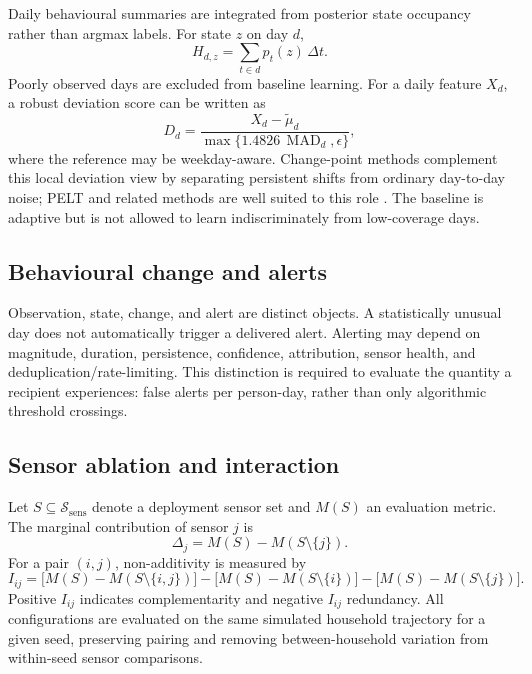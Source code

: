 \documentclass[11pt]{article}
\newcommand{\calS}{\mathcal{S}}
\begin{document}
Daily behavioural summaries are integrated from posterior state occupancy rather than argmax labels. For state $z$ on day $d$,
\begin{equation}
    H_{d,z}=\sum_{t\in d} p_t(z)\,\Delta t.
\end{equation}
Poorly observed days are excluded from baseline learning. For a daily feature $X_d$, a robust deviation score can be written as
\begin{equation}
    D_d =
    \frac{X_d-\widetilde{\mu}_d}
    {\max\{1.4826\,\operatorname{MAD}_d,\epsilon\}},
\end{equation}
where the reference may be weekday-aware. Change-point methods complement this local deviation view by separating persistent shifts from ordinary day-to-day noise; PELT and related methods are well suited to this role \citep{killick2012pelt}. The baseline is adaptive but is not allowed to learn indiscriminately from low-coverage days.

\subsection{Behavioural change and alerts}

Observation, state, change, and alert are distinct objects. A statistically unusual day does not automatically trigger a delivered alert. Alerting may depend on magnitude, duration, persistence, confidence, attribution, sensor health, and deduplication/rate-limiting. This distinction is required to evaluate the quantity a recipient experiences: false alerts per person-day, rather than only algorithmic threshold crossings.

\subsection{Sensor ablation and interaction}

Let $S\subseteq\calS_{\mathrm{sens}}$ denote a deployment sensor set and $M(S)$ an evaluation metric. The marginal contribution of sensor $j$ is
\begin{equation}
    \Delta_j = M(S)-M(S\setminus\{j\}).
\end{equation}
For a pair $(i,j)$, non-additivity is measured by
\begin{equation}
I_{ij} = \big[M(S)-M(S\setminus\{i,j\})\big]
-\big[M(S)-M(S\setminus\{i\})\big]
-\big[M(S)-M(S\setminus\{j\})\big].
\end{equation}
Positive $I_{ij}$ indicates complementarity and negative $I_{ij}$ redundancy. All configurations are evaluated on the same simulated household trajectory for a given seed, preserving pairing and removing between-household variation from within-seed sensor comparisons.
\end{document}
